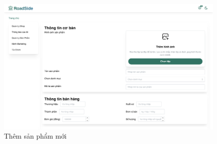 \begin{itemize}
\begin{figure}[H]
            \begin{center}
            \includegraphics[width=\linewidth] {Images/UI/shop_addproduct.png}
            \end{center}
            \caption{Thêm sản phẩm mới}
        \end{figure}
\end{itemize}

